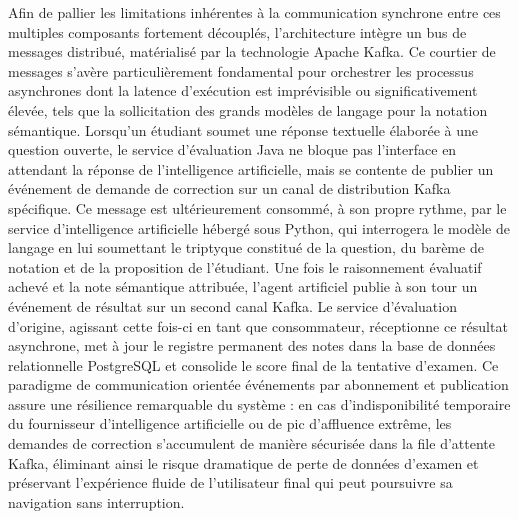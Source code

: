 Afin de pallier les limitations inhérentes à la communication synchrone entre ces multiples composants fortement découplés, l'architecture intègre un bus de messages distribué, matérialisé par la technologie Apache Kafka. Ce courtier de messages s'avère particulièrement fondamental pour orchestrer les processus asynchrones dont la latence d'exécution est imprévisible ou significativement élevée, tels que la sollicitation des grands modèles de langage pour la notation sémantique. Lorsqu'un étudiant soumet une réponse textuelle élaborée à une question ouverte, le service d'évaluation Java ne bloque pas l'interface en attendant la réponse de l'intelligence artificielle, mais se contente de publier un événement de demande de correction sur un canal de distribution Kafka spécifique. Ce message est ultérieurement consommé, à son propre rythme, par le service d'intelligence artificielle hébergé sous Python, qui interrogera le modèle de langage en lui soumettant le triptyque constitué de la question, du barème de notation et de la proposition de l'étudiant. Une fois le raisonnement évaluatif achevé et la note sémantique attribuée, l'agent artificiel publie à son tour un événement de résultat sur un second canal Kafka. Le service d'évaluation d'origine, agissant cette fois-ci en tant que consommateur, réceptionne ce résultat asynchrone, met à jour le registre permanent des notes dans la base de données relationnelle PostgreSQL et consolide le score final de la tentative d'examen. Ce paradigme de communication orientée événements par abonnement et publication assure une résilience remarquable du système : en cas d'indisponibilité temporaire du fournisseur d'intelligence artificielle ou de pic d'affluence extrême, les demandes de correction s'accumulent de manière sécurisée dans la file d'attente Kafka, éliminant ainsi le risque dramatique de perte de données d'examen et préservant l'expérience fluide de l'utilisateur final qui peut poursuivre sa navigation sans interruption.


